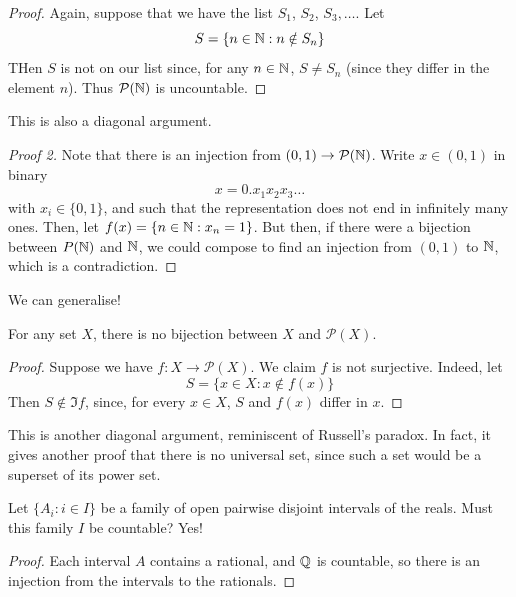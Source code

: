 \documentclass{../../template/note}
\begin{document}
    \begin{proof}
        Again, suppose that we have the list \(S_1\), \(S_2\), \(S_3, \dots\). Let
        \[
            S = \{n \in \mathbb N: n \notin S_n\}
        \]
        THen \(S\) is not on our list since, for any \(n \in \mathbb N\), \(S \neq S_n\) (since they differ in the element \(n\)). Thus \(\mathcal P(\mathbb N)\) is uncountable.
    \end{proof}
    
    This is also a diagonal argument.

    \begin{proof}[Proof 2]
        Note that there is an injection from \((0, 1) \to \mathcal P(\mathbb N)\). Write \(x \in (0, 1)\) in binary
        \[
            x = 0.x_1x_2x_3\dots
        \]
        with \(x_i \in \{0, 1\}\), and such that the representation does not end in infinitely many ones. Then, let \(f(x) = \{n \in \mathbb N: x_n = 1\}\). But then, if there were a bijection between \(P(\mathbb N)\) and \(\mathbb N\), we could compose to find an injection from \((0, 1)\) to \(\mathbb N\), which is a contradiction.
    \end{proof}

    We can generalise!
    
    \begin{theorem}[Cantor]
        For any set \(X\), there is no bijection between \(X\) and \(\mathcal P(X)\).
    \end{theorem}
    
    \begin{proof}
        Suppose we have \(f: X \to \mathcal P(X)\). We claim \(f\) is not surjective. Indeed, let
        \[
            S = \{x \in X: x \notin f(x)\}
        \]
        Then \(S \notin \Im f\), since, for every \(x \in X\), \(S\) and \(f(x)\) differ in \(x\).
    \end{proof}
    
    This is another diagonal argument, reminiscent of Russell's paradox. In fact, it gives another proof that there is no universal set, since such a set would be a superset of its power set.
    
    \begin{example}
        Let \(\{A_i: i \in I\}\) be a family of open pairwise disjoint intervals of the reals. Must this family \(I\) be countable? Yes!
    \end{example}
    
    \begin{proof}
        Each interval \(A\) contains a rational, and \(\mathbb Q\) is countable, so there is an injection from the intervals to the rationals.
    \end{proof}
    
\end{document}
